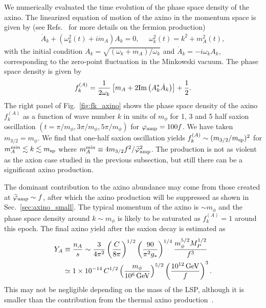 \documentclass[12pt, a4paper]{article}
\begin{document}
We numerically evaluated the time evolution of the phase space density of the axino.
The linearized equation of motion of the axino in the momentum space is given by
(see Refs.~\cite{Greene:1998nh,Peloso:2000hy,Asaka:2010kv,Ema:2016oxl} for more details on the fermion production)
\begin{align}
	\ddot {A}_k + \left(\omega_k^2(t) + i \dot m_A \right) A_k = 0,~~~~~~\omega_k^2(t) = k^2 + m_A^2(t),
\end{align}
with the initial condition $A_k =\sqrt{(\omega_k + m_A) / \omega_k}$ and $\dot A_k = -i\omega_k A_k$,
corresponding to the zero-point fluctuation in the Minkowski vacuum.
The phase space density is given by
\begin{align}
	f_k^{(A)} = \frac{1}{2\omega_k}\left[ m_A + 2 {\rm Im}\left( A_k^* \dot A_k \right) \right] + \frac{1}{2}.
\end{align}
The right panel of Fig.~\ref{fig:fk_axino} shows the phase space density of the axino $f_k^{(A)}$ as a function of wave number $k$ in units of $m_\phi$
for 1, 3 and 5 half saxion oscillation $(t=\pi/m_\phi, 3\pi/m_\phi, 5\pi/m_\phi)$ for $\varphi_{\rm amp} = 100f$.
We have taken $m_{3/2} = m_\phi$.
We find that one-half saxion oscillation yields $f_k ^{(A)}\sim (m_{3/2} / m_{\rm sp})^2$ for $m_A^{\rm min} \lesssim k \lesssim m_{\rm sp}$
where $m_A^{\rm min} \equiv 4 m_{3/2} f^2 / \widetilde\varphi_{\rm amp}^2$.
The production is not as violent as the axion case studied in the previous subsection, but still there can be a significant axino production.

The dominant contribution to the axino abundance may come from those created at $\widetilde\varphi_{\rm amp} \sim f$,
after which the axino production will be suppressed as shown in Sec.~\ref{sec:axino_small}.
The typical momentum of the axino is $\sim m_\phi$
and the phase space density around $k\sim m_\phi$ is likely to be saturated as $f_k^{(A)} = 1$ around this epoch.
The final axino yield after the saxion decay is estimated as
\begin{align}
	Y_A &\equiv \frac{n_A}{s} \sim \frac{3}{4\pi^2}\left( \frac{C}{8\pi} \right)^{1/2}\left( \frac{90}{\pi^2 g_*} \right)^{1/4} \frac{m_\phi^{5/2} M_P^{1/2}}{f^3 }\nonumber\\
	&\simeq 1\times 10^{-14}\,C^{1/2}  \left( \frac{{m}_\phi}{10^6\,{\rm GeV}} \right)^{5/2}\left( \frac{10^{12}\,{\rm GeV}}{f} \right)^{3}.
\end{align}
This may not be negligible depending on the mass of the LSP,
although it is smaller than the contribution from the thermal axino production~\cite{Brandenburg:2004du,Strumia:2010aa,Chun:2011zd,Bae:2011jb}.
\end{document}

